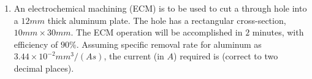 \documentclass[journal]{IEEEtran}
\begin{document}
\begin{enumerate}
    \item An electrochemical machining (ECM) is to be used to cut a through hole into a $12 mm$ thick aluminum plate. The hole has a rectangular cross-section, $10 mm \times 30 mm$. The ECM operation will be accomplished in $2$ minutes, with efficiency of $90\%$. Assuming specific removal rate for aluminum as $3.44 \times 10^{-2} mm^3 /(A s)$, the current (in $A$) required is \underline{\hspace{1cm}} (correct to two decimal places).

    \end{enumerate}
\end{document}
